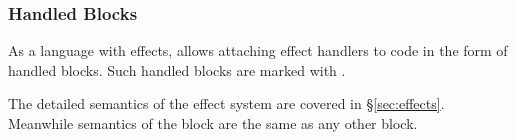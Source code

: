 \subsubsection{Handled Blocks}

As a language with effects, \Prose{} allows attaching effect handlers to code
in the form of handled blocks. Such handled blocks are marked with .

\begin{bnf*}
\end{bnf*}

The detailed semantics of the effect system are covered in \S\ref{sec:effects}.
Meanwhile semantics of the  block are the same as any other block.

\begin{prooftree}
\end{prooftree}
